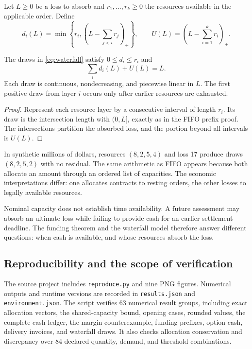 Let $L\ge0$ be a loss to absorb and $r_1,\ldots,r_k\ge0$ the resources available in the applicable order. Define
\begin{equation}
 d_i(L)=\min\left\{r_i,\left(L-\sum_{j<i}r_j\right)_+\right\},
 \qquad U(L)=\left(L-\sum_{i=1}^kr_i\right)_+.
\label{eq:waterfall}
\end{equation}

\begin{proposition}
The draws in \eqref{eq:waterfall} satisfy $0\le d_i\le r_i$ and
\begin{equation}
 \sum_id_i(L)+U(L)=L.
\end{equation}
Each draw is continuous, nondecreasing, and piecewise linear in $L$. The first positive draw from layer $i$ occurs only after earlier resources are exhausted.
\end{proposition}
\begin{proof}
Represent each resource layer by a consecutive interval of length $r_i$. Its draw is the intersection length with $(0,L]$, exactly as in the FIFO prefix proof. The intersections partition the absorbed loss, and the portion beyond all intervals is $U(L)$.
\end{proof}

In synthetic millions of dollars, resources $(8,2,5,4)$ and loss 17 produce draws $(8,2,5,2)$ with no residual. The same arithmetic as FIFO appears because both allocate an amount through an ordered list of capacities. The economic interpretations differ: one allocates contracts to resting orders, the other losses to legally available resources.

Nominal capacity does not establish time availability. A future assessment may absorb an ultimate loss while failing to provide cash for an earlier settlement deadline. The funding theorem and the waterfall model therefore answer different questions: when cash is available, and whose resources absorb the loss.

\subsection{Reproducibility and the scope of verification}

The source project includes \texttt{reproduce.py} and nine PNG figures. Numerical outputs and runtime versions are recorded in \texttt{results.json} and \texttt{environment.json}. The script verifies 63 numerical result groups, including exact allocation vectors, the shared-capacity bound, opening cases, rounded values, the complete cash ledger, the margin counterexample, funding prefixes, option cash, delivery invoices, and waterfall draws. It also checks allocation conservation and discrepancy over 84 declared quantity, demand, and threshold combinations.

